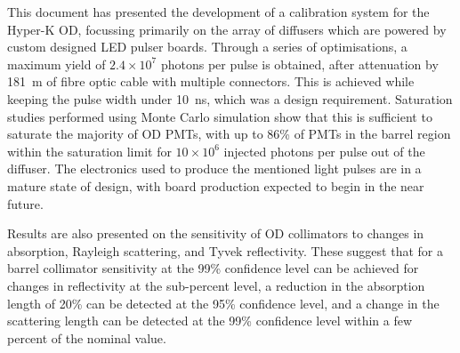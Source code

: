 \documentclass[a4paper,11pt]{article}
\begin{document}
This document has presented the development of a calibration system for the Hyper-K OD, focussing primarily on the array of diffusers which are powered by custom designed LED pulser boards. Through a series of optimisations, a maximum yield of $2.4\times10^7$ photons per pulse is obtained, after attenuation by 181~m of fibre optic cable with multiple connectors. This is achieved while keeping the pulse width under 10~ns, which was a design requirement. Saturation studies performed using Monte Carlo simulation show that this is sufficient to saturate the majority of OD PMTs, with up to 86\% of PMTs in the barrel region within the saturation limit for $10\times10^6$ injected photons per pulse out of the diffuser. The electronics used to produce the mentioned light pulses are in a mature state of design, with board production expected to begin in the near future.

Results are also presented on the sensitivity of OD collimators to changes in absorption, Rayleigh scattering, and Tyvek reflectivity. These suggest that for a barrel collimator sensitivity at the 99\% confidence level can be achieved for changes in reflectivity at the sub-percent level, a reduction in the absorption length of 20\% can be
detected at the 95\% confidence level, and a change in the scattering length can be detected at the 99\% confidence level within a few percent of the nominal value.


\appendix







\printbibliography
\end{document}
